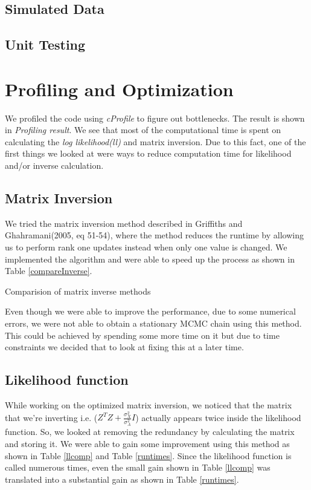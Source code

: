 \documentclass{article}
\begin{document}
\subsection{Simulated Data}


\subsection{Unit Testing}


\section{Profiling and Optimization}
We profiled the code using \textit{cProfile} to figure out bottlenecks. The result is shown in \textit{Profiling result}. We see that most of the computational time is spent on calculating the \textit{log likelihood(ll)}  and matrix inversion. Due to this fact, one of the first things we looked at were ways to reduce computation time for likelihood and/or inverse calculation.\\


\subsection{Matrix Inversion}
We tried the matrix inversion method described in Griffiths and Ghahramani(2005, eq 51-54), where the method reduces the runtime by allowing us to perform rank one updates instead when only one value is changed. We implemented the algorithm and were able to speed up the process as shown in Table \ref{compareInverse}.

\begin{table}[ht]
\centering
\caption{Comparision of matrix inverse methods \label{compareInverse}}

\end{table}

Even though we were able to improve the performance, due to some numerical errors, we were not able to obtain a stationary MCMC chain using this method. This could be achieved by spending some more time on it but due to time constraints we decided that to look at fixing this at a later time.\\

\subsection{Likelihood function}
While working on the optimized matrix inversion, we noticed that the matrix that we're inverting i.e. ($Z^TZ+\frac{\sigma_X^2}{\sigma_A^2}I$) actually appears twice inside the likelihood function. So, we looked at removing the redundancy by calculating the matrix and storing it. We were able to gain some improvement using this method as shown in Table \ref{llcomp} and Table \ref{runtimes}. Since the likelihood function is called numerous times, even the small gain shown in Table \ref{llcomp} was translated into a substantial gain as shown in Table \ref{runtimes}.\\
\end{document}
